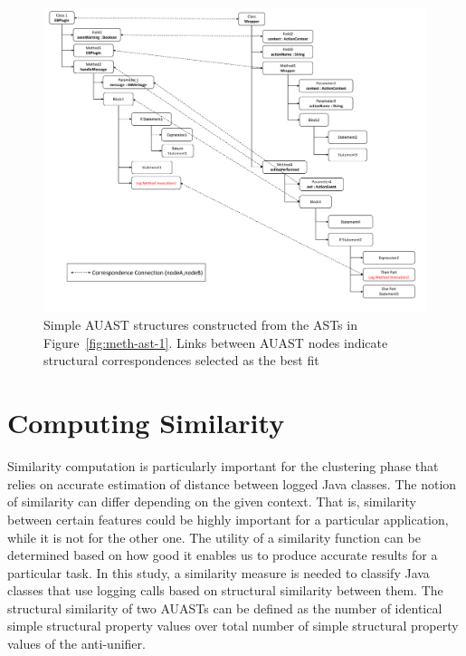 \begin{figure} [H]
  \centering\includegraphics [width = \textwidth]{Drawing4/FinalCorr.pdf}
  \caption{Simple AUAST structures constructed from the ASTs in Figure~\ref{fig:meth-ast-1}. Links between AUAST nodes indicate structural correspondences selected as the best fit}
  \label{fig:AUASTs}
\end{figure}


\section{Computing Similarity} \label{meth-similarity}
Similarity computation is particularly important for the clustering phase that relies on accurate estimation of distance between logged Java classes. The notion of similarity can differ depending on the given context. That is, similarity between certain features could be highly important for a particular application, while it is not for the other one. The utility of a similarity function can be determined based on how good it enables us to produce accurate results for a particular task. In this study, a similarity measure is needed to classify Java classes that use logging calls based on structural similarity between them. The structural similarity of two AUASTs can be defined as the number of identical simple structural property values over total number of simple structural property values of the anti-unifier.


